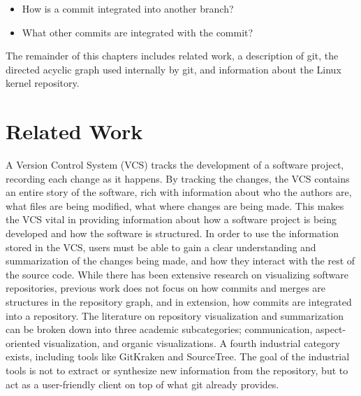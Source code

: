 \begin{textbox}
\begin{itemize}
  \item How is a commit integrated into another branch?
  \item What other commits are integrated with the commit?
\end{itemize}
\end{textbox}

The remainder of this chapters includes related work, a description of
git, the directed acyclic graph used internally by git, and information
about the Linux kernel repository.

\section{Related Work}\label{sec:related_work}

A Version Control System (VCS) tracks the development of a software project,
recording each change as it happens. By tracking the changes, the VCS
contains an entire story of the software, rich with information about
who the authors are, what files are being modified, what where changes
are being made. This makes the VCS vital in providing information about
how a software project is being developed and how the software is
structured. In order to use the information stored in the VCS, users
must be able to gain a clear understanding and summarization of the
changes being made, and how they interact with the rest of the source
code. While there has been extensive research on visualizing software
repositories, previous work does not focus on how commits and merges are
structures in the repository graph, and in extension, how commits are
integrated into a repository. The literature on repository visualization
and summarization can be broken down into three academic subcategories;
communication\cite{Cubranic2005,Begel2010}, aspect-oriented
visualization\cite{Ambros2005,Burch2005,Ambros2009}, and organic
visualizations\cite{ogawa09,Caudwell2010}. A fourth industrial category
exists, including tools like GitKraken and SourceTree. The goal of the
industrial tools is not to extract or synthesize new information from
the repository, but to act as a user-friendly client on top of what git
already provides.


